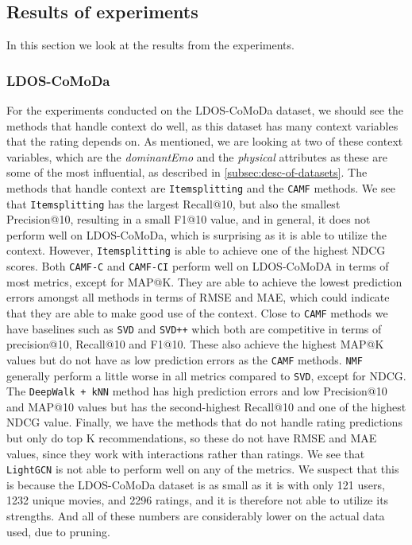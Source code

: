 \subsection{Results of experiments}
In this section we look at the results from the experiments.
\subsubsection{LDOS-CoMoDa}
For the experiments conducted on the LDOS-CoMoDa dataset, we should see the methods that handle context do well, as this dataset has many context variables that the rating depends on.
As mentioned, we are looking at two of these context variables, which are the \textit{dominantEmo} and the \textit{physical} attributes as these are some of the most influential, as described in \autoref{subsec:desc-of-datasets}.
The methods that handle context are \texttt{Itemsplitting} and the \texttt{CAMF} methods.
We see that \texttt{Itemsplitting} has the largest Recall@10, but also the smallest Precision@10, resulting in a small F1@10 value, and in general, it does not perform well on LDOS-CoMoDa, which is surprising as it is able to utilize the context.
However, \texttt{Itemsplitting} is able to achieve one of the highest NDCG scores.
Both \texttt{CAMF-C} and \texttt{CAMF-CI} perform well on LDOS-CoMoDA in terms of most metrics, except for MAP@K.
They are able to achieve the lowest prediction errors amongst all methods in terms of RMSE and MAE, which could indicate that they are able to make good use of the context.
Close to \texttt{CAMF} methods we have baselines such as \texttt{SVD} and \texttt{SVD++} which both are competitive in terms of precision@10, Recall@10 and F1@10. 
These also achieve the highest MAP@K values but do not have as low prediction errors as the \texttt{CAMF} methods.
\texttt{NMF} generally perform a little worse in all metrics compared to \texttt{SVD}, except for NDCG.
The \texttt{DeepWalk + kNN} method has high prediction errors and low Precision@10 and MAP@10 values but has the second-highest Recall@10 and one of the highest NDCG value.
Finally, we have the methods that do not handle rating predictions but only do top K recommendations, so these do not have RMSE and MAE values, since they work with interactions rather than ratings.
We see that \texttt{LightGCN} is not able to perform well on any of the metrics.
We suspect that this is because the LDOS-CoMoDa dataset is as small as it is with only 121 users, 1232 unique movies, and 2296 ratings, and it is therefore not able to utilize its strengths.
And all of these numbers are considerably lower on the actual data used, due to pruning.
